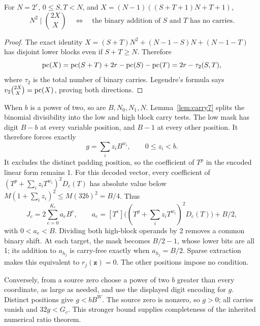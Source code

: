 \begin{lemma}\label{lem:carry7}
For $N=2^r$, $0\le S,T<N$, and
$X=(N-1)((S+T+1)N+T+1)$,
\[
 N^2\mid\binom{2X}{X}\quad\Longleftrightarrow\quad
 \text{the binary addition of $S$ and $T$ has no carries}.
\]
\end{lemma}
\begin{proof}
The exact identity
$X=(S+T)N^2+(N-1-S)N+(N-1-T)$ has disjoint lower blocks even if
$S+T\ge N$. Therefore
\[
\operatorname{pc}(X)=\operatorname{pc}(S+T)+2r-\operatorname{pc}(S)-\operatorname{pc}(T)=2r-\tau_2(S,T),
\]
where $\tau_2$ is the total number of binary carries. Legendre's formula
says $v_2\binom{2X}{X}=\operatorname{pc}(X)$, proving both directions.
\end{proof}

When $b$ is a power of two, so are $B,N_0,N_1,N$. Lemma~\ref{lem:carry7}
splits the binomial divisibility into the low and high block carry tests.
The low mask has digit $B-b$ at every variable position, and $B-1$ at every
other position. It therefore forces exactly
\[
 g=\sum_i z_iB^{w_i},\qquad 0\le z_i<b.
\]
It excludes the distinct padding position, so the coefficient of $T^p$ in
the encoded linear form remains 1. For this decoded vector, every
coefficient of $(T^p+\sum_i z_iT^{w_i})^2D_c(T)$ has absolute value below
$M(1+\sum_i z_i)^2\le M(32b)^2=B/4$. Thus
\[
 J_c=2\sum_{e=0}^{K_c}a_eB^e,\qquad
 a_e=[T^e]\bigl((T^p+\sum_i z_iT^{w_i})^2D_c(T)\bigr)+B/2,
\]
with $0<a_e<B$. Dividing both high-block operands by 2 removes a common
binary shift. At each target, the mask becomes $B/2-1$, whose lower bits
are all 1; its addition to $a_{h_j}$ is carry-free exactly when
$a_{h_j}=B/2$. Sparse extraction makes this equivalent to $r_j(\mathbf z)=0$.
The other positions impose no condition.

Conversely, from a source zero choose a power of two $b$ greater than every
coordinate, as large as needed, and use the displayed digit encoding for $g$.
Distinct positions give $g<bB^W$. The source zero is nonzero, so $g>0$;
all carries vanish and $32g<G_c$. This stronger bound supplies completeness
of the inherited numerical ratio theorem.

